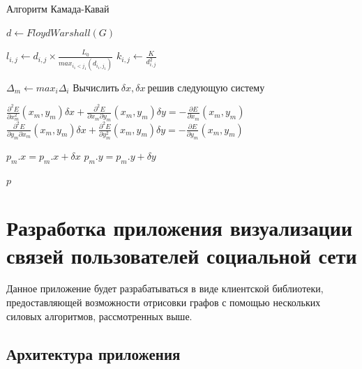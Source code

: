 \documentclass[14pt, russian]{scrartcl}
\begin{document}
\begin{algorithm}[H]
\caption{Алгоритм Камада-Кавай}\label{alg:kk}
\begin{algorithmic}
  
  \State $d \gets FloydWarshall(G)$
  
	\State {}
        \State $l_{i,j} \gets d_{i, j} \times \frac{L_0}{max_{i_1 < j_1}(d_{i_1, j_1})} $ 
        \State $k_{i,j} \gets \frac{K}{d^{2}_{i, j}} $ 
       
      \EndIf
     
  
    \EndFor
  \EndFor

  \State {}
  
  \State $\Delta_m \gets max_i \Delta_i$
   \State $\text{Вычислить} \ \delta x, \delta x \ \text{решив следующую систему}$
  
   \State $ \frac{\partial^2 E}{\partial x^{2}_m}(x_m, y_m)\delta x + \frac{\partial^2 E}{\partial x_m \partial y_m}(x_m, y_m)\delta y = -\frac{\partial E}{\partial x_m}(x_m, y_m) $
   \State $ \frac{\partial^2 E}{\partial y_m \partial x_m}(x_m, y_m)\delta x + \frac{\partial^2 E}{\partial y^{2}_m}(x_m, y_m)\delta y = -\frac{\partial E}{\partial y_m}(x_m, y_m) $

   \State $p_m.x = p_m.x + \delta x$
   \State $p_m.y = p_m.y + \delta y$
  \EndWhile
  \EndWhile
  
	\State \Return $p$
	\EndFunction

\end{algorithmic}
\end{algorithm}




\section{Разработка приложения визуализации связей пользователей социальной сети}


Данное приложение будет разрабатываться в виде клиентской библиотеки,
предоставляющей возможности отрисовки графов с помощью нескольких силовых алгоритмов, рассмотренных выше.

\subsection{Архитектура приложения}
\end{document}
